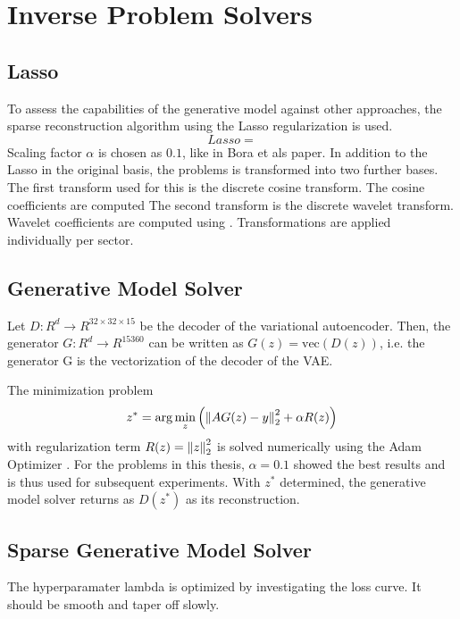 \section{Inverse Problem Solvers}

\subsection{Lasso}
To assess the capabilities of the generative model against other approaches, the sparse reconstruction algorithm using the Lasso regularization \parencite{Lasso} is used.
\begin{equation}
    Lasso = 
\end{equation}
Scaling factor $\alpha$ is chosen as $0.1$, like in Bora et als paper.
In addition to the Lasso in the original basis, the problems is transformed into two further bases.
The first transform used for this is the discrete cosine transform.
The cosine coefficients are computed
The second transform is the discrete wavelet transform.
Wavelet coefficients are computed using \parencite{PyWavelets}.
Transformations are applied individually per sector.

\subsection{Generative Model Solver}
Let $D: R^d \rightarrow R^{32 \times 32 \times 15}$ be the decoder of the variational autoencoder.
Then, the generator $G: R^d \rightarrow R^{15360}$ can be written as $G(z) = \text{vec}(D(z))$, i.e. the generator G is the vectorization of the decoder of the VAE.

The minimization problem
\begin{equation}
    z^* = \arg\min_{z}{\left( \left\lVert A G(z) - y\right\rVert_2^2 + \alpha R(z) \right)}
\end{equation}
with regularization term $R(z) = \left\lVert z\right\rVert_2^2$ is solved numerically using the Adam Optimizer \parencite{Adam}.
For the problems in this thesis, $\alpha = 0.1$ showed the best results and is thus used for subsequent experiments.
With $z^*$ determined, the generative model solver returns as $D(z^*)$ as its reconstruction.

\subsection{Sparse Generative Model Solver}
The hyperparamater lambda is optimized by investigating the loss curve.
It should be smooth and taper off slowly.
